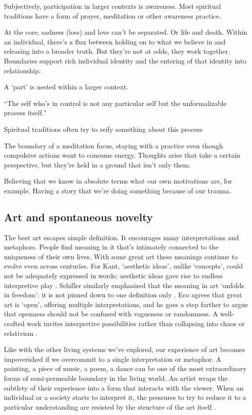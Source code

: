 Subjectively, participation in larger contexts is awareness. Most spiritual traditions have a form of prayer, meditation or other awareness practice. 

At the core, sadness (loss) and love can't be separated. Or life and death. Within an individual, there's a flux between holding on to what we believe in and releasing into a broader truth. But they're not at odds, they work together. Boundaries support rich individual identity and the entering of that identity into relationship.

A `part' is nested within a larger context. 

``The self who's in control is not any particular self but the unformalizable process itself."

Spiritual traditions often try to reify something about this process 


The boundary of a meditation focus, staying with a practice even though compulsive actions want to consume energy. Thoughts arise that take a certain perspective, but they're held in a ground that isn't only them.

Believing that we know in absolute terms what our own motivations are, for example. Having a story that we're doing something because of our trauma. 


\subsection{Art and spontaneous novelty}

The best art escapes simple definition. It encourages many interpretations and metaphors. People find meaning in it that's intimately connected to the uniqueness of their own lives. With some great art these meanings continue to evolve even across centuries. For Kant, `aesthetic ideas', unlike `concepts', could not be adequately expressed in words; aesthetic ideas gave rise to endless interpretive play \citep{kant1781critik}. Schiller similarly emphasized that the meaning in art `unfolds in freedom': it is not pinned down to one definition only \citep{schiller1795aesthetische}. Eco agrees that great art is `open', offering multiple interpretations, and he goes a step farther to argue that openness should not be confused with vagueness or randomness. A well-crafted work invites interpretive possibilities rather than collapsing into chaos or relativism \citep{eco1962opera}. 

Like with the other living systems we've explored, our experience of art becomes impoverished if we overcommit to a single interpretation or metaphor. A painting, a piece of music, a poem, a dance can be one of the most extraordinary forms of semi-permeable boundary in the living world. An artist wraps the subtlety of their experience into a form that interacts with the viewer. When an individual or a society starts to interpret it, the pressures to try to reduce it to a particular understanding are resisted by the structure of the art itself \citep{gadamer1960wahrheit, barthes1970sz, wimsatt1946intentional, empson1930seven}. 

